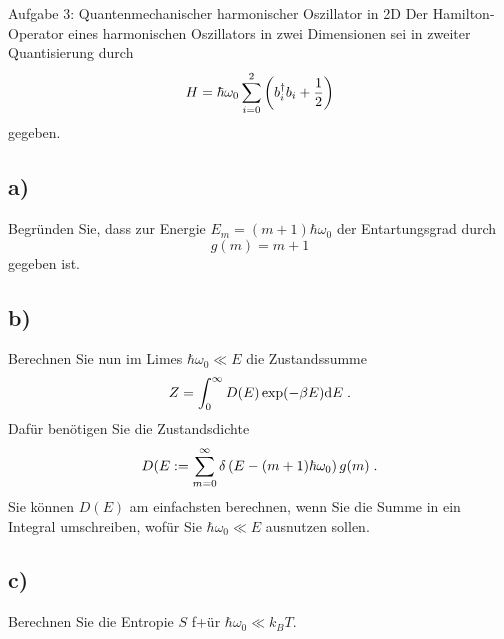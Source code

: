 \begin{aufgabe}{Aufgabe 3: Quantenmechanischer harmonischer Oszillator in 2D}
    Der Hamilton-Operator eines harmonischen Oszillators in zwei Dimensionen sei in zweiter Quantisierung durch
    \[
        H = \hbar\omega_0 \sum_{i=0}^{2}{\left(b_i^\dagger b_i + \frac{1}{2}\right)}
    \]
    gegeben.

    \subsection{a)}
    Begründen Sie, dass zur Energie $E_m = (m+1)\hbar\omega_0$ der Entartungsgrad durch
    \[
        g(m) = m + 1
    \]
    gegeben ist.

    \subsection{b)}
    Berechnen Sie nun im Limes $\hbar\omega_0 \ll E$ die Zustandssumme
    \[
        Z = \int_0^\infty{D(E) \exp(-\beta E) \mathrm{d}E} \;.
    \]
    Dafür benötigen Sie die Zustandsdichte
    \[
        D(E := \sum_{m=0}^\infty{\delta\left(E - (m+1) \hbar\omega_0\right) g(m)} \;.
    \]
    Sie können $D(E)$ am einfachsten berechnen,
    wenn Sie die Summe in ein Integral umschreiben,
    wofür Sie $\hbar\omega_0 \ll E$ ausnutzen sollen.

    \subsection{c)}
    Berechnen Sie die Entropie $S$ f+ür $\hbar\omega_0 \ll k_B T$.
\end{aufgabe}

